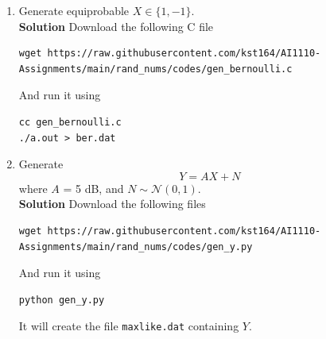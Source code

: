 \documentclass[journal, 12pt, twocolumn]{IEEEtran}
\begin{document}
\begin{enumerate}[label=\arabic{section}.\arabic*]
    \item
        Generate equiprobable $X \in \{1, -1\}$.
        \\
        \textbf{Solution} Download the following C file
        \begin{lstlisting}
wget https://raw.githubusercontent.com/kst164/AI1110-Assignments/main/rand_nums/codes/gen_bernoulli.c
        \end{lstlisting}
        And run it using
        \begin{lstlisting}
cc gen_bernoulli.c
./a.out > ber.dat
        \end{lstlisting}

    \item
        Generate
        \begin{equation}
            Y = AX + N
        \end{equation}
        where $A$ = 5 dB, and $ N \sim \mathcal{N}(0, 1)$.
        \\
        \textbf{Solution} Download the following files
        \begin{lstlisting}
wget https://raw.githubusercontent.com/kst164/AI1110-Assignments/main/rand_nums/codes/gen_y.py
        \end{lstlisting}
        And run it using
        \begin{lstlisting}
python gen_y.py
        \end{lstlisting}
        It will create the file \texttt{maxlike.dat} containing $Y$.


\end{enumerate}
\end{document}
